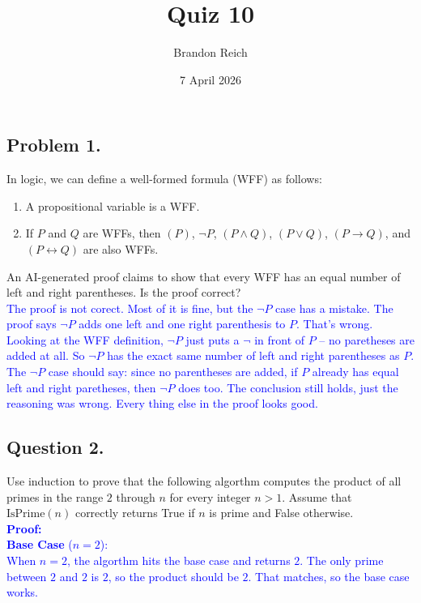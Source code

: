 \documentclass{article}
\title{Quiz 10}
\author{Brandon Reich}
\date{7 April 2026}
\begin{document}
\maketitle

\subsection*{Problem 1.}
In logic, we can define a well-formed formula (WFF) as follows:
\begin{enumerate}
    \item A propositional variable is a WFF.
    \item If $P$ and $Q$ are WFFs, then $(P)$, $\neg P$, $(P \land Q)$, $(P \lor Q)$, $(P \to Q)$, and $(P \leftrightarrow Q)$ are also WFFs.
\end{enumerate}
An AI-generated proof claims to show that every WFF has an equal number of left and right parentheses. Is the proof correct? \\[0.5em]

\textcolor{blue}{
The proof is not corect. Most of it is fine, but the $\neg P$ case has a mistake. The proof says $\neg P$ adds one left and one right parenthesis to $P$. That's wrong. Looking at the WFF definition, $\neg P$ just puts a $\neg$ in front of $P$ -- no paretheses are added at all. So $\neg P$ has the exact same number of left and right parentheses as $P$. The $\neg P$ case should say: since no parentheses are added, if $P$ already has equal left and right paretheses, then $\neg P$ does too. The conclusion still holds, just the reasoning was wrong. Every thing else in the proof looks good.
} \\[0.5em]

\subsection*{Question 2.}
Use induction to prove that the following algorthm computes the product of all primes in the range $2$ through $n$ for every integer $n > 1$. Assume that $\text{IsPrime}(n)$ correctly returns True if $n$ is prime and False otherwise. \\[0.5em]

\textcolor{blue}{\textbf{Proof:}} \\[0.5em]

\textcolor{blue}{\textbf{Base Case} ($n = 2$):} \\[0.3em]
\textcolor{blue}{
When $n = 2$, the algorthm hits the base case and returns $2$. The only prime between $2$ and $2$ is $2$, so the product should be $2$. That matches, so the base case works.
} \\[0.5em]
\end{document}
